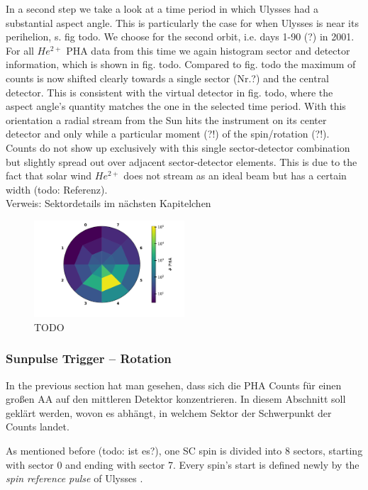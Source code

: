 In a second step we take a look at a time period in which Ulysses had a substantial aspect angle. This is particularly the case for when Ulysses is near its perihelion, s. fig todo. We choose for the second orbit, i.e. days 1-90 (?) in 2001. For all $He^{2+}$ PHA data from this time we again histogram sector and detector information, which is shown in fig. todo. Compared to fig. todo the maximum of counts is now shifted clearly towards a single sector (Nr.?) and the central detector. This is consistent with the virtual detector in fig. todo, where the aspect angle's quantity matches the one in the selected time period. With this orientation a radial stream from the Sun hits the instrument on its center detector and only while a particular moment (?!) of the spin/rotation (?!). Counts do not show up exclusively with this single sector-detector combination but slightly spread out over adjacent sector-detector elements. This is due to the fact that solar wind $He^{2+}$ does not stream as an ideal beam but has a certain width (todo: Referenz).
\\ Verweis: Sektordetails im nächsten Kapitelchen

\begin{figure}[h]
	\includegraphics[width=0.5\textwidth]{Figures/hist_det_sec_aa_90days2001}
	\centering
	\caption{TODO}
	\label{TODO}
\end{figure}


\subsubsection{Sunpulse Trigger -- Rotation}
In the previous section hat man gesehen, dass sich die PHA Counts für einen großen AA auf den mittleren Detektor konzentrieren. In diesem Abschnitt soll geklärt werden, wovon es abhängt, in welchem Sektor der Schwerpunkt der Counts landet. 

As mentioned before (todo: ist es?), one SC spin is divided into 8 sectors, starting with sector 0 and ending with sector 7.
Every spin's start is defined newly by the \textit{spin reference pulse} of Ulysses \citep{hiscale}. 

